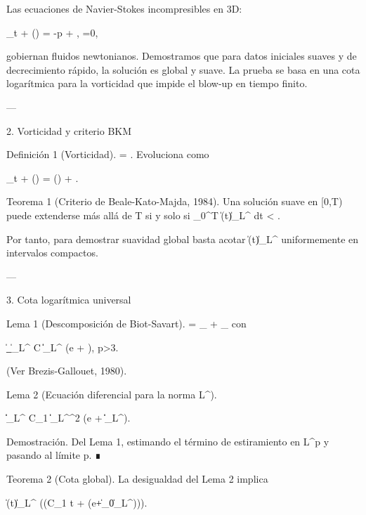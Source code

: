 \documentclass[12pt,twoside]{book}
\begin{document}
Las ecuaciones de Navier-Stokes incompresibles en 3D:

\partial_t  + (\cdot\nabla) = -\nabla p + \nu \Delta {}, \quad \nabla\cdot{}=0,

gobiernan fluidos newtonianos. Demostramos que para datos iniciales suaves y de decrecimiento rápido, la solución es global y suave. La prueba se basa en una cota logarítmica para la vorticidad que impide el blow-up en tiempo finito.

---

2. Vorticidad y criterio BKM

Definición 1 (Vorticidad). \boldsymbol{\omega} = \nabla \times {}. Evoluciona como

\partial_t \boldsymbol{\omega} + (\cdot\nabla)\boldsymbol{\omega} = (\boldsymbol{\omega}\cdot\nabla) + \nu \Delta \boldsymbol{\omega}.

Teorema 1 (Criterio de Beale-Kato-Majda, 1984). Una solución suave en [0,T) puede extenderse más allá de T si y solo si \int_0^T \|\boldsymbol{\omega}(t)\|_{L^\infty} dt < \infty.

Por tanto, para demostrar suavidad global basta acotar \|\boldsymbol{\omega}(t)\|_{L^\infty} uniformemente en intervalos compactos.

---

3. Cota logarítmica universal

Lema 1 (Descomposición de Biot-Savart).  = _{} + _{} con

\|\nabla {}_{}\|_{L^\infty} \le C \|\boldsymbol{\omega}\|_{L^\infty} \log\left(e + \right), \quad p>3.

(Ver Brezis-Gallouet, 1980).

Lema 2 (Ecuación diferencial para la norma L^\infty).

\|\boldsymbol{\omega}\|_{L^\infty} \le C_1 \|\boldsymbol{\omega}\|_{L^\infty}^2 \log(e + \|\boldsymbol{\omega}\|_{L^\infty}).

Demostración. Del Lema 1, estimando el término de estiramiento en L^p y pasando al límite p\to\infty. ∎

Teorema 2 (Cota global). La desigualdad del Lema 2 implica

\|\boldsymbol{\omega}(t)\|_{L^\infty} \le \exp(\exp(C_1 t + \ln\ln(e+\|\boldsymbol{\omega}_0\|_{L^\infty}))).
\end{document}
